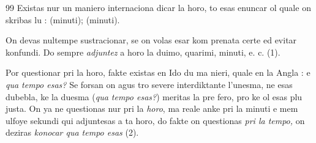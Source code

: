 \begin{VUpage}[103]{99}
Existas nur un maniero internaciona dicar la horo, to\nl
esas enuncar ol quale on skribas lu : \nl
{}\nl
{} (minuti); \nl
{} (minuti).

On devas nultempe sustracionar, se on volas esar kom\cc
prenata certe ed evitar konfundi. Do sempre \textit{adjuntez} a horo\nl
la duimo, quarimi, minuti, e. c. (1).

Por questionar pri la horo, fakte existas en Ido du ma\cc
nieri, quale en la Angla :  e \textit{qua tempo esas?}\nl
Se forsan on agus tro severe interdiktante l'unesma, ne esas\nl
dubebla, ke la duesma (\textit{qua tempo esas?}) meritas la pre\cc
fero, pro ke ol esas plu justa. On ya ne questionas nur pri\nl
la \textit{horo}, ma reale anke pri la minuti e mem ulfoye sekundi\nl
qui adjuntesas a ta horo, do fakte on questionas \textit{pri la tempo,}\nl
on deziras \textit{konocar qua tempo esas} (2).
\end{VUpage}

